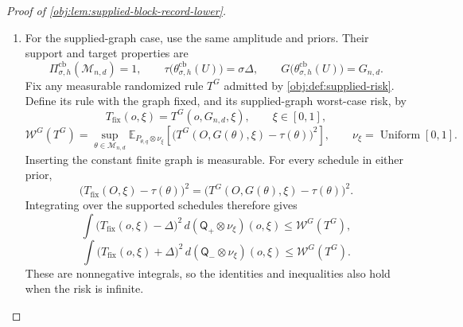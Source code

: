 \begin{proof}[Proof of \cref{obj:lem:supplied-block-record-lower}]
\begin{enumerate}
\item For the supplied-graph case, use the same amplitude and priors. Their support and target properties are
\[
\Pi^{\mathrm{cb}}_{\sigma,h}(\mathcal M_{n,d})=1,
\qquad
\tau\bigl(\theta^{\mathrm{cb}}_{\sigma,h}(U)\bigr)=\sigma\Delta,
\qquad
G\bigl(\theta^{\mathrm{cb}}_{\sigma,h}(U)\bigr)=G_{n,d}.
\]
Fix any measurable randomized rule \(T^G\) admitted by
\cref{obj:def:supplied-risk}. Define its rule with the graph fixed, and its supplied-graph worst-case risk, by
\[
T_{\mathrm{fix}}(o,\xi)=T^G(o,G_{n,d},\xi),
\qquad \xi\in[0,1],
\]
\[
\mathcal W^G(T^G)
=
\sup_{\theta\in\mathcal M_{n,d}}
\mathbb E_{P_{\theta,q}\otimes\nu_\xi}
\left[
\bigl(T^G(O,G(\theta),\xi)-\tau(\theta)\bigr)^2
\right],
\qquad
\nu_\xi=\operatorname{Uniform}[0,1].
\]
Inserting the constant finite graph is measurable. For every schedule in either prior,
\[
\bigl(T_{\mathrm{fix}}(O,\xi)-\tau(\theta)\bigr)^2
=
\bigl(T^G(O,G(\theta),\xi)-\tau(\theta)\bigr)^2.
\]
Integrating over the supported schedules therefore gives
\[
\int
\bigl(T_{\mathrm{fix}}(o,\xi)-\Delta\bigr)^2
\,d(\mathsf Q_+\otimes\nu_\xi)(o,\xi)
\le\mathcal W^G(T^G),
\]
\[
\int
\bigl(T_{\mathrm{fix}}(o,\xi)+\Delta\bigr)^2
\,d(\mathsf Q_-\otimes\nu_\xi)(o,\xi)
\le\mathcal W^G(T^G).
\]
These are nonnegative integrals, so the identities and inequalities also hold when the risk is infinite.


\end{enumerate}
\end{proof}
